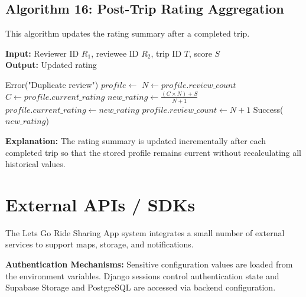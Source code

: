 \subsection{Algorithm 16: Post-Trip Rating Aggregation}

This algorithm updates the rating summary after a completed trip.

\begin{breakablealgorithm}
\small
\caption{Rating Aggregation}
\textbf{Input:} Reviewer ID $R_1$, reviewee ID $R_2$, trip ID $T$, score $S$ \\
\textbf{Output:} Updated rating
\begin{algorithmic}[1]
        \State \Return Error("Duplicate review")
    \EndIf
    \State {}
    \State $profile \gets$ 
    \State $N \gets profile.review\_count$
    \State $C \gets profile.current\_rating$
    \State $new\_rating \gets \frac{(C \times N) + S}{N + 1}$
    \State $profile.current\_rating \gets new\_rating$
    \State $profile.review\_count \gets N + 1$
    \State {}
    \State \Return Success($new\_rating$)
\EndFunction
\end{algorithmic}
\end{breakablealgorithm}

\textbf{Explanation:} The rating summary is updated incrementally after each completed trip so that the stored profile remains current without recalculating all historical values.


\section{External APIs / SDKs}

The Lets Go Ride Sharing App system integrates a small number of external services to support maps, storage, and notifications.

\textbf{Authentication Mechanisms:} Sensitive configuration values are loaded from the environment variables. Django sessions control authentication state and Supabase Storage and PostgreSQL are accessed via backend configuration.

